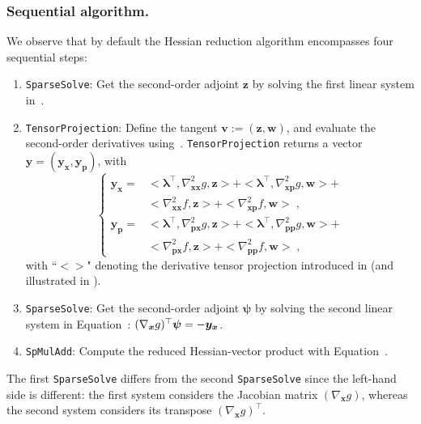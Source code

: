 \subsubsection{Sequential algorithm.}
We observe that by default the Hessian reduction algorithm encompasses four sequential steps:
\begin{enumerate}
  \item {\tt SparseSolve}: Get the second-order adjoint $\bm{z}$
    by solving the first linear system in~.
  \item {\tt TensorProjection}: Define the tangent $\bm{v} := (\bm{z}, \bm{w})$, and evaluate the
    second-order derivatives using~. {\tt TensorProjection}
    returns a vector $\bm{y} = (\bm{y}_{\bm{x}}, \bm{y}_{\bm{p}})$,
    with
    \begin{equation}
      \label{eq:reduction}
      \left\{
        \begin{aligned}
          \bm{y}_{\bm{x}} =&
         <\bm{\lambda}^\top,\nabla_{\bm{x}\bm{x}}^2g,\bm{z}>+
         <\bm{\lambda}^\top,\nabla_{\bm{x}\bm{p}}^2g,\bm{w}>+ \\
         &<\nabla_{\bm{x}\bm{x}}^2f,\bm{z}>+
         <\nabla_{\bm{x}\bm{p}}^2f,\bm{w}>\; ,\\
          \bm{y}_{\bm{p}} =&
         <\bm{\lambda}^\top,\nabla_{\bm{p}\bm{x}}^2g,\bm{z}>+
         <\bm{\lambda}^\top,\nabla_{\bm{p}\bm{p}}^2g,\bm{w}>+\\
         &<\nabla_{\bm{p}\bm{x}}^2f,\bm{z}>+
         <\nabla_{\bm{p}\bm{p}}^2f,\bm{w}>\; ,
        \end{aligned}
      \right.
    \end{equation}
    with ``$<>$" denoting the derivative tensor projection introduced in 
    (and illustrated in ).
  \item {\tt SparseSolve}: Get the second-order adjoint $\bm{\psi}$ by solving the second
    linear system in Equation~: $
    (\grad{g}{\bm{x}})^\top \bm{\psi} = - \bm{y}_{\bm{x}}$.
  \item {\tt SpMulAdd}: Compute the reduced Hessian-vector product with Equation~.
\end{enumerate}
The first {\tt SparseSolve} differs from the second {\tt SparseSolve} since the left-hand side is different: the first
system considers the Jacobian matrix $(\nabla_{\bm{x}}g)$, whereas the second system considers
its transpose $(\nabla_{\bm{x}}g)^\top$.


